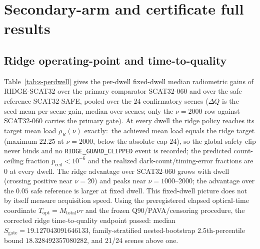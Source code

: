 \documentclass[10pt]{article}
\newcommand{\rhoR}{\rho_{R}}
\begin{document}
\section{Secondary-arm and certificate full results}
\label{sec:s-secondary}
\subsection{Ridge operating-point and time-to-quality}
Table~\ref{tab:s-perdwell} gives the per-dwell fixed-dwell median radiometric
gains of \textsc{RIDGE-SCAT32} over the primary comparator
\textsc{SCAT32-060} and over the safe reference \textsc{SCAT32-SAFE}, pooled
over the $24$ confirmatory scenes ($\Delta Q$ is the seed-mean per-scene gain,
median over scenes; only the $\nu = 2000$ row against \textsc{SCAT32-060}
carries the primary gate). At every dwell the ridge policy reaches its target
mean load $\rhoR(\nu)$ exactly:\ the achieved mean load equals the ridge
target (maximum $22.25$ at $\nu = 2000$, below the absolute cap $24$), so the
global safety clip never binds and no \texttt{RIDGE\_GUARD\_CLIPPED} event is
recorded; the predicted count-ceiling fraction $p_{\mathrm{ceil}} < 10^{-6}$
and the realized dark-count/timing-error fractions are $0$ at every dwell. The
ridge advantage over \textsc{SCAT32-060} grows with dwell (crossing positive
near $\nu = 20$) and peaks near $\nu = 1000$--$2000$; the advantage over the
$0.05$ safe reference is larger at fixed dwell. This fixed-dwell picture does
not by itself measure acquisition speed. Using the preregistered elapsed
optical-time coordinate
$T_{\mathrm{opt}}=M_{\mathrm{total}}\nu\tau$ and the frozen Q90/PAVA/censoring
procedure, the corrected ridge time-to-quality endpoint passed: median
$S_{\mathrm{gate}}=19.127043091646133$, family-stratified nested-bootstrap
2.5th-percentile bound $18.328492357080282$, and 21/24 scenes above one.
\end{document}
